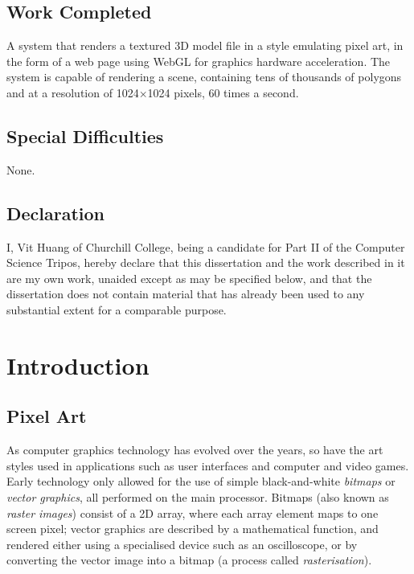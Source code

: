 \documentclass[12pt,twoside,notitlepage]{report}
\begin{document}
\section*{Work Completed}

A system that renders a textured 3D model file in a style emulating pixel art, in the form of a web page using WebGL for graphics hardware acceleration. The system is capable of rendering a scene, containing tens of thousands of polygons and at a resolution of 1024$\times$1024 pixels, 60 times a second.

\section*{Special Difficulties}

None.
 
\newpage
\section*{Declaration}

I, Vit Huang of Churchill College, being a candidate for Part II of the Computer Science Tripos, hereby declare that this dissertation and the work described in it are my own work, unaided except as may be specified below, and that the dissertation does not contain material that has already been used to any substantial extent for a comparable purpose.

\bigskip
{}

\medskip
{}

\cleardoublepage

\tableofcontents

\chapter{Introduction}

\section{Pixel Art}

As computer graphics technology has evolved over the years, so have the art styles used in applications such as user interfaces and computer and video games. Early technology only allowed for the use of simple black-and-white \textit{bitmaps} or \textit{vector graphics}, all performed on the main processor. Bitmaps (also known as \textit{raster images}) consist of a 2D array, where each array element maps to one screen pixel; vector graphics are described by a mathematical function, and rendered either using a specialised device such as an oscilloscope, or by converting the vector image into a bitmap (a process called \textit{rasterisation}).
\end{document}
